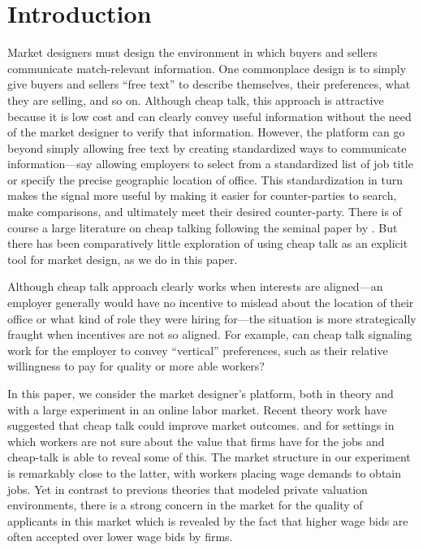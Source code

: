 \documentclass[12pt]{article}
\begin{document}
\begin{abstract} 
\JPEabstract{} \\
  \emph{Keywords:} search, matching, market design, experimentation 
\end{abstract} 

\onehalfspacing

\section{Introduction}
Market designers must design the environment in which buyers and sellers communicate match-relevant information.
One commonplace design is to simply give buyers and sellers ``free text'' to describe themselves, their preferences, what they are selling, and so on.
Although cheap talk, this approach is attractive because it is low cost and can clearly convey useful information without the need of the market designer to verify that information.
However, the platform can go beyond simply allowing free text by creating standardized ways to communicate information---say allowing employers to select from a standardized list of job title or specify the precise geographic location of office.
This standardization in turn makes the signal more useful by making it easier for counter-parties to search, make comparisons, and ultimately meet their desired counter-party.
There is of course a large literature on cheap talking following the seminal paper by \cite{crawford1982strategic}.
But there has been comparatively little exploration of using cheap talk as an explicit tool for market design, as we do in this paper.

Although cheap talk approach clearly works when interests are aligned---an employer generally would have no incentive to mislead about the location of their office or what kind of role they were hiring for---the situation is more strategically fraught when incentives are not so aligned. 
For example, can cheap talk signaling work for the employer to convey ``vertical'' preferences, such as their relative willingness to pay for quality or more able workers?

In this paper, we consider the market designer's platform, both in theory and with a large experiment in an online labor market. 
Recent theory work have suggested that cheap talk could improve market outcomes.
\cite{menzio2007theory} and \cite{kimKircher2015} for settings in which workers are not sure about the value that firms have for the jobs and cheap-talk is able to reveal some of this.
The market structure in our experiment is remarkably close to the latter, with workers placing wage demands to obtain jobs.
Yet in contrast to previous theories that modeled private valuation environments, there is a strong concern in the market for the quality of applicants in this market which is revealed by the fact that higher wage bids are often accepted over lower wage bids by firms. 
\end{document}
